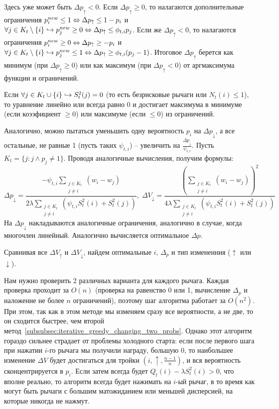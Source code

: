 Здесь уже может быть $\Delta p_{\uparrow} < 0$. Если $\Delta p_{\uparrow} \geq 0$, то налагаются дополнительные ограничения $p_i^{new} \leq 1 \Leftrightarrow \Delta p_{\uparrow} \leq 1 - p_i$ и $\forall j \in K_t \setminus \{i\} \hookrightarrow p_j^{new} \geq 0 \Leftrightarrow \Delta p_{\uparrow} \leq \phi_{t,i} p_j$. Если же $\Delta p_{\uparrow} < 0$, то налагаются ограничения $p_i^{new} \geq 0 \Leftrightarrow \Delta p_{\uparrow} \geq -p_i$ и $\forall j \in K_t \setminus \{i\} \hookrightarrow p_j^{new} \leq 1 \Leftrightarrow \Delta p_{\uparrow} \geq \phi_{t,i} (p_j - 1)$. Итоговое $\Delta p_{\uparrow}$ берется как минимум (при $\Delta p_{\uparrow} \geq 0$) или как максимум (при $\Delta p_{\uparrow} < 0$) от аргмаксимума функции и ограничений.

Если $\forall j \in K_t \cup \{i\} \hookrightarrow S_t^2(j) = 0$ (то есть безрисковые рычаги или $N_t(i) \leq 1$), то уравнение линейно или всегда равно 0 и достигает максимума в минимуме (если коээфициент $\geq 0$) или максимуме (если $\leq 0$) из ограничений.

Аналогично, можно пытаться уменьшить одну вероятность $p_i$ на $\Delta p_{\downarrow}$, а все остальные, не равные 1 (пусть таких $\psi_{t,i}$) -- увеличить на $\frac{\Delta p_{\downarrow}}{\psi_{t,i}}$. Пусть $K_t = \{j: j \land p_j \neq 1 \}$. Проводя аналогичные вычисления, получим формулы:
\[
\Delta p_{\downarrow} = \frac{-\psi_{t,i} \sum_{\substack{j \in K_t \\ j \neq i}} (w_i - w_j)}{2\lambda \sum_{\substack{j \in K_t \\ j \neq i}} ( \psi_{t,i} S_t^2(i) + S_t^2(j) )}, \; \Delta V_{\downarrow} = \frac{\left( \sum_{\substack{j \in K_t \\ j \neq i}} (w_i - w_j) \right)^2}{4\lambda \sum_{\substack{j \in K_t \\ j \neq i}} ( \psi_{t,i} S_t^2(i) + S_t^2(j) )}
\]
На $\Delta p_{\downarrow}$ накладываются аналогичные ограничения, аналогично в случае, когда многочлен линейный. Аналогично вычисляется оптимальное $\Delta p$.

Сравнивая все $\Delta V_{\uparrow}$ и $\Delta V_{\downarrow}$, найдем оптимальные $i, \, \Delta_p$ и тип измененния ($\uparrow$ или $\downarrow$).

Нам нужно проверить 2 различных варианта для каждого рычага. Каждая проверка проходит за $O(n)$ (проверка на равенство 0 или 1, вычисление $\Delta_p$ и наложение не более $n$ ограничений), поэтому шаг алгоритма работает за $O(n^2)$. При этом, так как в этом методе мы изменяем сразу все вероятности, а не две, то он сходится быстрее, чем второй метод~\autoref{subsubsec:iterative_greedy_changing_two_probs}. Однако этот алгоритм гораздо сильнее страдает от проблемы холодного старта: если после первого шага при нажатии $i$-го рычага мы получили награду, большую 0, то наибольшее изменение $\Delta V$ будет достигаться для тройки $(i, \uparrow, \frac{n-1}{n})$, и вся вероятность сконцентрируется в $p_i$. Если затем всегда будет $Q_t(i) - \lambda S_t^2(i) > 0$, что вполне реально, то алгоритм всегда будет нажимать на $i$-ый рычаг, в то время как могут быть рычаги с большим матожиданием или меньшей дисперсией, на которые никогда не нажмут.

